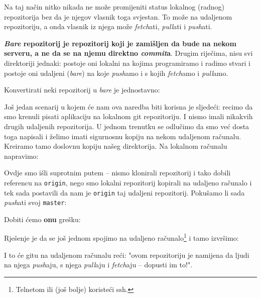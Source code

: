 Na taj način nitko nikada ne može promijeniti status lokalnog (radnog) repozitorija bez da je njegov vlasnik toga svjestan.
To može na udaljenom repozitoriju, a onda vlasnik iz njega može \emph{fetch}ati, \emph{pull}ati i \emph{push}ati.

\textbf{\emph{Bare} repozitorij je repozitorij koji je zamišljen da bude na nekom serveru, a ne da se na njemu direktno \emph{commit}a}.
Drugim riječima, nisu svi direktoriji jednaki: 
postoje oni lokalni na kojima programiramo i radimo stvari i postoje oni udaljeni (\emph{bare}) na koje \emph{push}amo i s kojih \emph{fetch}amo i \emph{pull}amo.

Konvertirati neki repozitorij u \emph{bare} je jednostavno:


Još jedan scenarij u kojem će nam ova naredba biti korisna je sljedeći: recimo da smo krenuli pisati aplikaciju na lokalnom git repozitoriju.
I nismo imali nikakvih drugih udaljenih repozitorija.
U jednom trenutku se odlučimo da smo već dosta toga napisali i želimo imati sigurnosnu kopiju na nekom udaljenom računalu.
Kreiramo tamo doslovnu kopiju našeg direktorija.
Na lokalnom računalu napravimo:


Ovdje smo išli suprotnim putem -- nismo klonirali repozitorij i tako dobili referencu na \verb+origin+, nego smo lokalni repozitorij kopirali na udaljeno računalo i tek sada postavili da nam je \verb+origin+ taj udaljeni repozitorij.
Pokušamo li sada \emph{push}ati svoj \verb+master+:


Dobiti ćemo \textbf{onu} grešku:


Rješenje je da se još jednom spojimo na udaljeno računalo\footnote{Telnetom ili (još bolje) koristeći ssh.} i tamo izvršimo:


I to će gitu na udaljenom računalu reći: "ovom repozitoriju je namijena da ljudi na njega \emph{push}aju, s njega \emph{pull}aju i \emph{fetch}aju -- dopusti im to!".


